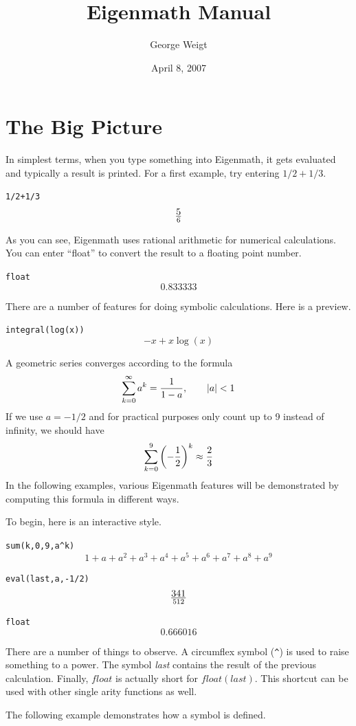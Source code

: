 \documentclass[12pt,openany]{report}
\title{Eigenmath Manual}
\author{George Weigt}
\date{April 8, 2007}
\begin{document}
\maketitle
\tableofcontents

\newpage

\chapter{The Big Picture}
In simplest terms, when you type something into Eigenmath,
it gets evaluated and typically a result is printed.
For a first example, try entering $1/2+1/3$.

\medskip
\verb$1/2+1/3$
$$5\over6$$

\medskip
\noindent
As you can see, Eigenmath uses rational arithmetic for numerical calculations.
You can enter ``float'' to convert the result to a floating point number.

\medskip
\verb$float$
$$0.833333$$

\medskip
\noindent
There are a number of features for doing symbolic calculations.
Here is a preview.

\medskip
\verb$integral(log(x))$
$$-x+x\log(x)$$

\newpage

\noindent
A geometric series converges according to the formula
$$\sum_{k=0}^\infty a^k={1\over1-a},\qquad|a|<1$$
If we use $a=-1/2$ and for practical purposes only count up to 9 instead of infinity,
we should have
$$\sum_{k=0}^9\left(-{1\over2}\right)^k\approx{2\over3}$$
In the following examples, various Eigenmath features will be demonstrated
by computing this formula in different ways.

\medskip
\noindent
To begin, here is an interactive style.

\medskip
\verb$sum(k,0,9,a^k)$
$$1+a+a^2+a^3+a^4+a^5+a^6+a^7+a^8+a^9$$

\verb$eval(last,a,-1/2)$
$$341\over512$$

\verb$float$
$$0.666016$$

\medskip
\noindent
There are a number of things to observe.
A circumflex symbol (\verb$^$) is used to raise something to a power.
The symbol {\it last} contains the result of the previous calculation.
Finally, $float$ is actually short for $float(last)$.
This shortcut can be used with other single arity functions as well.

\newpage

\noindent
The following example demonstrates how a symbol is defined.
\end{document}
